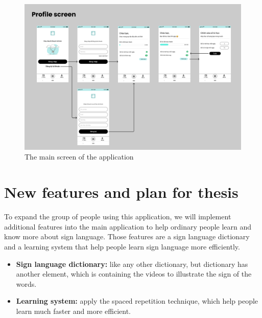 \begin{figure}[H]
  \centering
  \includegraphics[width=\textwidth]{img/Chap5/Profile_screen.png}
  \caption{The main screen of the application}
\end{figure}

\section{New features and plan for thesis}

To expand the group of people using this application, we will implement additional features into the main application to help ordinary people learn and know more about sign language. Those features are a sign language dictionary and a learning system that help people learn sign language more efficiently.

\begin{itemize}
  \item \textbf{Sign language dictionary:} like any other dictionary, but dictionary has another element, which is containing the videos to illustrate the sign of the words.
  \item \textbf{Learning system:} apply the spaced repetition technique, which help people learn much faster and more efficient.
\end{itemize}
